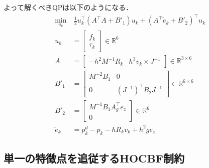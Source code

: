 よって解くべきQPは以下のようになる．
\begin{equation}
\begin{aligned}
\min_{u_k} &\: \frac{1}{2} u_k^\top (A^\top A + B'_1) u_k + (A^\top \tilde{e}_k + B'_2)^\top u_k \\
u_k &= \begin{bmatrix} f_k \\ \tau_k \end{bmatrix} \in \mathbb{R}^6 \\
A &= \begin{bmatrix} -h^2 M^{-1} R_k & h^3 v_k \times J^{-1} \end{bmatrix} \in \mathbb{R}^{3 \times 6} \\
B'_1 &= \begin{bmatrix} M^{-2} B_1 & 0 \\ 0 & (J^{-1})^\top B_2 J^{-1} \end{bmatrix} \in \mathbb{R}^{6 \times 6} \\
B'_2 &= \begin{bmatrix} M^{-1} B_1 A_g^\top e_z \\ 0 \end{bmatrix} \in \mathbb{R}^{6} \\
\tilde{e}_k &= p^d_{k} - p_k - h R_k v_k + h^2 g e_z
\label{eq:qp_holonomic}
\end{aligned}
\end{equation}

\subsection{単一の特徴点を追従するHOCBF制約}

